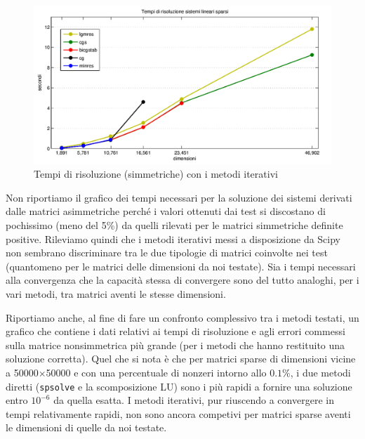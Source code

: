 \documentclass[11pt,a4paper]{scrartcl}
\begin{document}
\begin{figure}[!ht]
\centering
\includegraphics[scale=0.51]{images/tempi_iterativi} 
\caption{Tempi di risoluzione (simmetriche) con i metodi iterativi}
\label{tempi_iterativi}
\end{figure}

Non riportiamo il grafico dei tempi necessari per la soluzione dei sistemi derivati dalle matrici asimmetriche perché i valori ottenuti dai test si discostano di pochissimo (meno del 5\%) da quelli rilevati per le matrici simmetriche definite positive. Rileviamo quindi che i metodi iterativi messi a disposizione da Scipy non sembrano discriminare tra le due tipologie di matrici coinvolte nei test (quantomeno per le matrici delle dimensioni da noi testate). Sia i tempi necessari alla convergenza che la capacità stessa di convergere sono del tutto analoghi, per i vari metodi, tra matrici aventi le stesse dimensioni.

Riportiamo anche, al fine di fare un confronto complessivo tra i metodi testati, un grafico che contiene i dati relativi ai tempi di risoluzione e agli errori commessi sulla matrice nonsimmetrica più grande (per i metodi che hanno restituito una soluzione corretta). Quel che si nota è che per matrici sparse di dimensioni vicine a 50000$\times$50000 e con una percentuale di nonzeri intorno allo $0.1\%$, i due metodi diretti (\texttt{spsolve} e la scomposizione LU) sono i più rapidi a fornire una soluzione entro $10^{-6}$ da quella esatta. I metodi iterativi, pur riuscendo a convergere in tempi relativamente rapidi, non sono ancora competivi per matrici sparse aventi le dimensioni di quelle da noi testate.
\end{document}
